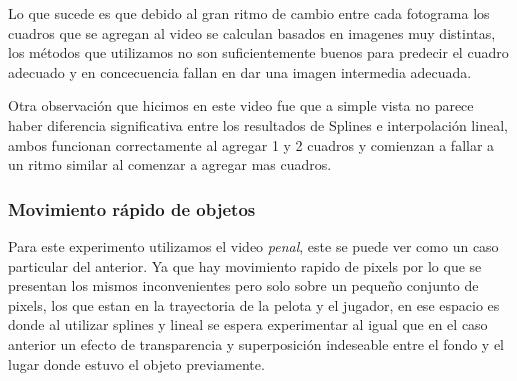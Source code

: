 Lo que sucede es que debido al gran ritmo de cambio entre cada fotograma los cuadros que se agregan al video se calculan basados en imagenes muy distintas, los métodos que utilizamos no son suficientemente buenos para predecir el cuadro adecuado y en concecuencia fallan en dar una imagen intermedia adecuada.

Otra observación que hicimos en este video fue que a simple vista no parece haber diferencia significativa entre los resultados de Splines e interpolación lineal, ambos funcionan correctamente al agregar 1 y 2 cuadros y comienzan a fallar a un ritmo similar al comenzar a agregar mas cuadros. 

\subsubsection{Movimiento rápido de objetos}

Para este experimento utilizamos el video \textit{penal}, este se puede ver como un caso particular del anterior. Ya que hay movimiento rapido de pixels por lo que se presentan los mismos inconvenientes pero solo sobre un pequeño conjunto de pixels, los que estan en la trayectoria de la pelota y el jugador, en ese espacio es donde al utilizar splines y lineal se espera experimentar al igual que en el caso anterior un efecto de transparencia y superposición indeseable entre el fondo y el lugar donde estuvo el objeto previamente.


